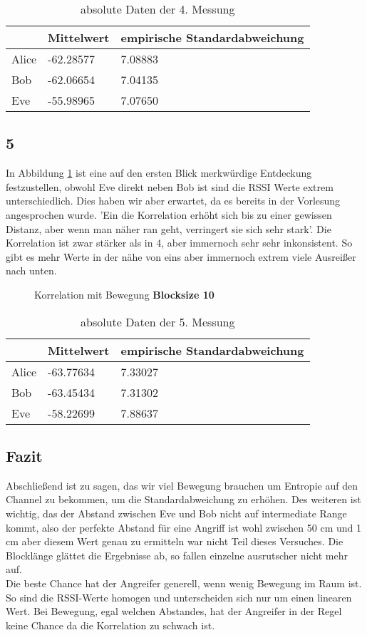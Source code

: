 \documentclass[12pt,a4paper]{article}
\begin{document}
\begin{table}[H]
\centering
\begin{tabular}{l|l|l}
& Mittelwert & empirische Standardabweichung \\
\hline
Alice & -62.28577 & 7.08883 \\
\hline
Bob & -62.06654 & 7.04135 \\
\hline
Eve & -55.98965 & 7.07650 \\
\end{tabular}
\caption{absolute Daten der 4. Messung}
\end{table}

\subsection*{5}
In Abbildung \ref{fig:5} ist eine auf den ersten Blick merkwürdige Entdeckung festzustellen, obwohl Eve direkt neben Bob ist sind die RSSI Werte extrem unterschiedlich. Dies haben wir aber erwartet, da es bereits in der Vorlesung angesprochen wurde. 'Ein die Korrelation erhöht sich bis zu einer gewissen Distanz, aber wenn man näher ran geht, verringert sie sich sehr stark'. Die Korrelation ist zwar stärker als in 4, aber immernoch sehr sehr inkonsistent. So gibt es mehr Werte in der nähe von eins aber immernoch extrem viele Ausreißer nach unten.
\begin{figure}[H]
\centering
{} \qquad
{}
\caption{Korrelation mit Bewegung \textbf{Blocksize 10}}
\label{fig:5}
\end{figure}

\begin{table}[H]
\centering
\begin{tabular}{l|l|l}
& Mittelwert & empirische Standardabweichung \\
\hline
Alice & -63.77634 & 7.33027 \\
\hline
Bob & -63.45434 & 7.31302 \\
\hline
Eve & -58.22699 & 7.88637 \\
\end{tabular}
\caption{absolute Daten der 5. Messung}
\end{table}
\subsection*{Fazit}
Abschließend ist zu sagen, das wir viel Bewegung brauchen um Entropie auf den Channel zu bekommen, um die Standardabweichung zu erhöhen. Des weiteren ist wichtig, das der Abstand zwischen Eve und Bob nicht auf intermediate Range kommt, also der perfekte Abstand für eine Angriff ist wohl zwischen 50 cm und 1 cm aber diesem Wert genau zu ermitteln war nicht Teil dieses Versuches. Die Blocklänge glättet die Ergebnisse ab, so fallen einzelne ausrutscher nicht mehr auf. \\
Die beste Chance hat der Angreifer generell, wenn wenig Bewegung im Raum ist. So sind die RSSI-Werte homogen und unterscheiden sich nur um einen linearen Wert. Bei Bewegung, egal welchen Abstandes, hat der Angreifer in der Regel keine Chance da die Korrelation zu schwach ist. 
\end{document}
